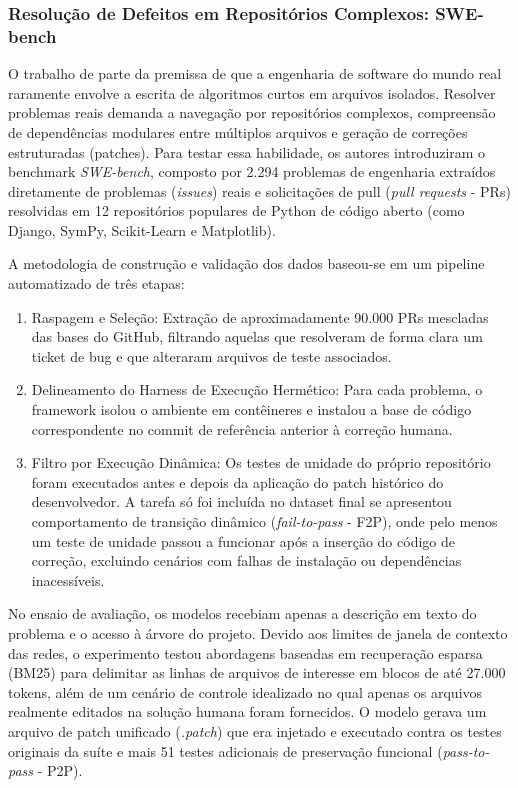 \subsubsection{Resolução de Defeitos em Repositórios Complexos: SWE-bench \cite{jimenez2024}}

O trabalho de  parte da premissa de que a engenharia de software do mundo real raramente envolve a escrita de algoritmos curtos em arquivos isolados. Resolver problemas reais demanda a navegação por repositórios complexos, compreensão de dependências modulares entre múltiplos arquivos e geração de correções estruturadas (patches). Para testar essa habilidade, os autores introduziram o benchmark \textit{SWE-bench}, composto por 2.294 problemas de engenharia extraídos diretamente de problemas (\textit{issues}) reais e solicitações de pull (\textit{pull requests} - PRs) resolvidas em 12 repositórios populares de Python de código aberto (como Django, SymPy, Scikit-Learn e Matplotlib).

A metodologia de construção e validação dos dados baseou-se em um pipeline automatizado de três etapas:
\begin{enumerate}
    \item Raspagem e Seleção: Extração de aproximadamente 90.000 PRs mescladas das bases do GitHub, filtrando aquelas que resolveram de forma clara um ticket de bug e que alteraram arquivos de teste associados.
    \item Delineamento do Harness de Execução Hermético: Para cada problema, o framework isolou o ambiente em contêineres e instalou a base de código correspondente no commit de referência anterior à correção humana. 
    \item Filtro por Execução Dinâmica: Os testes de unidade do próprio repositório foram executados antes e depois da aplicação do patch histórico do desenvolvedor. A tarefa só foi incluída no dataset final se apresentou comportamento de transição dinâmico (\textit{fail-to-pass} - F2P), onde pelo menos um teste de unidade passou a funcionar após a inserção do código de correção, excluindo cenários com falhas de instalação ou dependências inacessíveis.
\end{enumerate}

No ensaio de avaliação, os modelos recebiam apenas a descrição em texto do problema e o acesso à árvore do projeto. Devido aos limites de janela de contexto das redes, o experimento testou abordagens baseadas em recuperação esparsa (BM25) para delimitar as linhas de arquivos de interesse em blocos de até 27.000 tokens, além de um cenário de controle idealizado no qual apenas os arquivos realmente editados na solução humana foram fornecidos. O modelo gerava um arquivo de patch unificado (\textit{.patch}) que era injetado e executado contra os testes originais da suíte e mais 51 testes adicionais de preservação funcional (\textit{pass-to-pass} - P2P).

